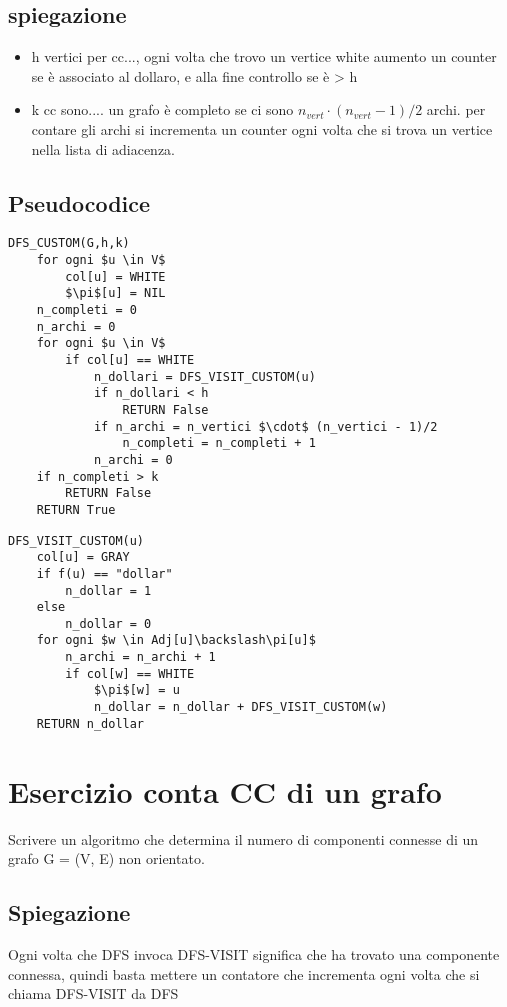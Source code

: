 \documentclass[12pt, a4paper, openany]{book}
\begin{document}
	\subsection*{spiegazione}
	\begin{itemize}
		\item h vertici per cc..., ogni volta che trovo un vertice white aumento un counter se è associato al dollaro, e alla fine controllo se è > h
		\item k cc sono.... un grafo è completo se ci sono $n_{vert} \cdot (n_{vert} -1)/2$ archi. per contare gli archi si incrementa un counter ogni volta che si trova un vertice nella lista di adiacenza.
	\end{itemize}

	\subsection*{Pseudocodice}
	\begin{lstlisting}[mathescape=true]
DFS_CUSTOM(G,h,k)
    for ogni $u \in V$
        col[u] = WHITE
        $\pi$[u] = NIL
    n_completi = 0
    n_archi = 0
    for ogni $u \in V$
        if col[u] == WHITE
            n_dollari = DFS_VISIT_CUSTOM(u)
            if n_dollari < h
                RETURN False
            if n_archi = n_vertici $\cdot$ (n_vertici - 1)/2
                n_completi = n_completi + 1
            n_archi = 0
    if n_completi > k
        RETURN False
    RETURN True
\end{lstlisting}

	\begin{lstlisting}[mathescape=true]
DFS_VISIT_CUSTOM(u)
    col[u] = GRAY
    if f(u) == "dollar"
        n_dollar = 1
    else
        n_dollar = 0
    for ogni $w \in Adj[u]\backslash\pi[u]$
        n_archi = n_archi + 1
        if col[w] == WHITE
            $\pi$[w] = u
            n_dollar = n_dollar + DFS_VISIT_CUSTOM(w)
    RETURN n_dollar
\end{lstlisting}

	\section{Esercizio conta CC di un grafo}
	Scrivere un algoritmo che determina il numero di componenti connesse di un grafo G =
	(V, E) non orientato.

	\subsection*{Spiegazione}
	Ogni volta che DFS invoca DFS-VISIT significa che ha trovato una componente connessa, quindi basta mettere un contatore che incrementa ogni volta che si chiama DFS-VISIT da DFS
\end{document}
